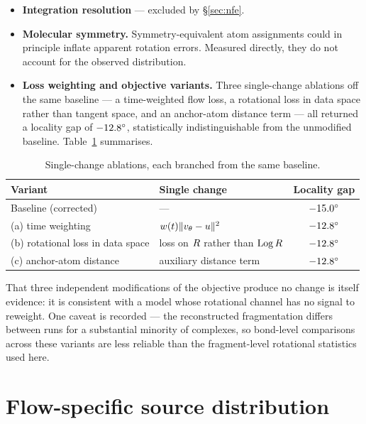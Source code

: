 \begin{itemize}[leftmargin=*,itemsep=2pt]
\item \textbf{Integration resolution} --- excluded by \S\ref{sec:nfe}.
\item \textbf{Molecular symmetry.} Symmetry-equivalent atom assignments could
      in principle inflate apparent rotation errors. Measured directly, they
      do not account for the observed distribution.
\item \textbf{Loss weighting and objective variants.} Three single-change
      ablations off the same baseline --- a time-weighted flow loss, a
      rotational loss in data space rather than tangent space, and an
      anchor-atom distance term --- all returned a locality gap of
      $-12.8^{\circ}$, statistically indistinguishable from the unmodified
      baseline. Table~\ref{tab:ablations} summarises.
\end{itemize}

\begin{table}[htbp]
\centering
\caption{Single-change ablations, each branched from the same baseline.}
\label{tab:ablations}
\small
\begin{tabular}{@{}llc@{}}
\toprule
Variant & Single change & Locality gap \\
\midrule
Baseline (corrected)   & --- & $-15.0^{\circ}$ \\
(a) time weighting     & $w(t)\|v_\theta - u\|^2$ & $-12.8^{\circ}$ \\
(b) rotational loss in data space & loss on $R$ rather than $\operatorname{Log} R$ & $-12.8^{\circ}$ \\
(c) anchor-atom distance & auxiliary distance term & $-12.8^{\circ}$ \\
\bottomrule
\end{tabular}
\end{table}

That three independent modifications of the objective produce no change is
itself evidence: it is consistent with a model whose rotational channel has no
signal to reweight. One caveat is recorded --- the reconstructed fragmentation
differs between runs for a substantial minority of complexes, so bond-level
comparisons across these variants are less reliable than the fragment-level
rotational statistics used here.

\section{Flow-specific source distribution}
\label{sec:source-results}

